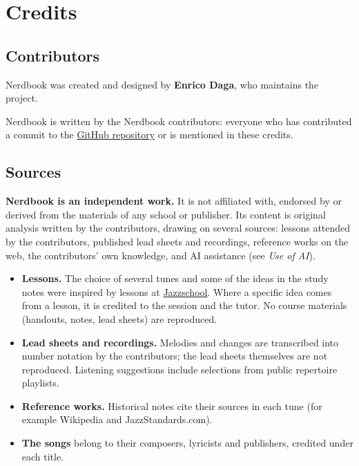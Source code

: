 \chapter*{Credits}

\section*{Contributors}
Nerdbook was created and designed by \textbf{Enrico Daga}, who maintains the project.

Nerdbook is written by the Nerdbook contributors: everyone who has contributed a commit to
the \href{https://github.com/enridaga/nerdbook}{GitHub repository} or is mentioned in these
credits.

\section*{Sources}
\textbf{Nerdbook is an independent work.} It is not affiliated with, endorsed by or derived
from the materials of any school or publisher. Its content is original analysis written by
the contributors, drawing on several sources: lessons attended by the contributors,
published lead sheets and recordings, reference works on the web, the contributors' own
knowledge, and AI assistance (see \emph{Use of AI}).

\begin{itemize}
\item \textbf{Lessons.} The choice of several tunes and some of the ideas in the study notes
  were inspired by lessons at \href{https://www.jazzschool.co.uk/}{Jazzschool}. Where a
  specific idea comes from a lesson, it is credited to the session and the tutor. No course
  materials (handouts, notes, lead sheets) are reproduced.
\item \textbf{Lead sheets and recordings.} Melodies and changes are transcribed into number
  notation by the contributors; the lead sheets themselves are not reproduced. Listening
  suggestions include selections from public repertoire playlists.
\item \textbf{Reference works.} Historical notes cite their sources in each tune
  (for example Wikipedia and JazzStandards.com).
\item \textbf{The songs} belong to their composers, lyricists and publishers, credited under
  each title.
\end{itemize}

